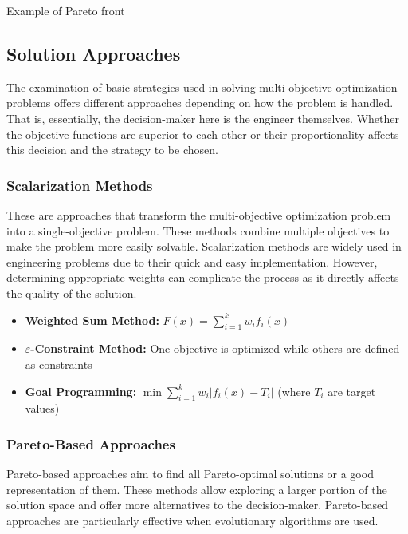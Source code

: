 \begin{marginfigure}
\centering
{}
\caption{Example of Pareto front}
\end{marginfigure}

\subsection{Solution Approaches}
The examination of basic strategies used in solving multi-objective optimization problems offers different approaches depending on how the problem is handled. That is, essentially, the decision-maker here is the engineer themselves. Whether the objective functions are superior to each other or their proportionality affects this decision and the strategy to be chosen.

\subsubsection{Scalarization Methods}
These are approaches that transform the multi-objective optimization problem into a single-objective problem. These methods combine multiple objectives to make the problem more easily solvable. Scalarization methods are widely used in engineering problems due to their quick and easy implementation. However, determining appropriate weights can complicate the process as it directly affects the quality of the solution.

\begin{tcolorbox}[title=Common Scalarization Methods]
\begin{itemize}
    \item \textbf{Weighted Sum Method:} $F(x) = \sum_{i=1}^{k} w_i f_i(x)$
    \item \textbf{$\varepsilon$-Constraint Method:} One objective is optimized while others are defined as constraints
    \item \textbf{Goal Programming:} $\min \sum_{i=1}^{k} w_i |f_i(x) - T_i|$ (where $T_i$ are target values)
\end{itemize}
\end{tcolorbox}

\subsubsection{Pareto-Based Approaches}
Pareto-based approaches aim to find all Pareto-optimal solutions or a good representation of them. These methods allow exploring a larger portion of the solution space and offer more alternatives to the decision-maker. Pareto-based approaches are particularly effective when evolutionary algorithms are used.


